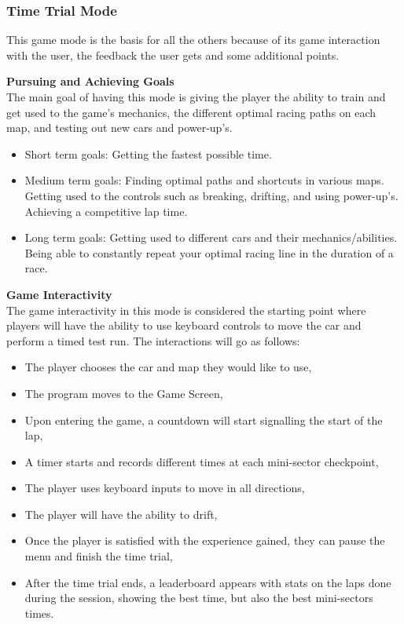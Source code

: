 \documentclass[12pt]{article}
\begin{document}
\subsubsection{Time Trial Mode}

This game mode is the basis for all the others because of its game interaction with the user, the feedback the user gets and some additional points.

\noindent\textbf{Pursuing and Achieving Goals}\\
The main goal of having this mode is giving the player the ability to train and get used to the game’s mechanics, the different optimal racing paths on each map, and testing out new cars and power-up’s.
\begin{itemize}
\item Short term goals: Getting the fastest possible time.
\item Medium term goals: Finding optimal paths and shortcuts in various maps. Getting used to the controls such as breaking, drifting, and using power-up’s. Achieving a competitive lap time.
\item Long term goals: Getting used to different cars and their mechanics/abilities. Being able to constantly repeat your optimal racing line in the duration of a race.
\end{itemize}

\noindent\textbf{Game Interactivity}\\
The game interactivity in this mode is considered the starting point where players will have the ability to use keyboard controls to move the car and perform a timed test run. The interactions will go as follows:
\begin{itemize}
\item The player chooses the car and map they would like to use,
\item The program moves to the Game Screen,
\item Upon entering the game, a countdown will start signalling the start of the lap,
\item A timer starts and records different times at each mini-sector checkpoint,
\item The player uses keyboard inputs to move in all directions,
\item The player will have the ability to drift,
\item Once the player is satisfied with the experience gained, they can pause the menu and finish the time trial,
\item After the time trial ends, a leaderboard appears with stats on the laps done during the session, showing the best time, but also the best mini-sectors times.
\end{itemize}
\end{document}
